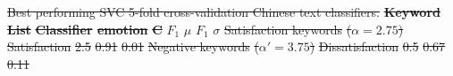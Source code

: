 \documentclass[smallextended,natbib]{svjour3}       %
\providecommand{\DIFdel}[1]{{\protect\color{red}\sout{#1}}}                      %
\providecommand{\DIFdelFL}[1]{\DIFdel{#1}} %
\begin{document}
{%
\DIFdelFL{Best performing SVC 5-fold cross-validation Chinese text classifiers.}}
\textbf{\DIFdelFL{Keyword List}} %
\textbf{%
\DIFdelFL{Classifier }%
\DIFdelFL{emotion}%
} %
\textbf{\DIFdelFL{C}} %
\DIFdelFL{\(F_1\) }%
\DIFdelFL{\(\mu\)}%
\DIFdelFL{\(F_1\) }%
\DIFdelFL{\(\sigma\)}%
\DIFdelFL{Satisfaction keywords }%
\DIFdelFL{(\(\alpha=2.75\))}%
\DIFdelFL{Satisfaction }%
\DIFdelFL{2.5 }%
\DIFdelFL{0.91 }%
\DIFdelFL{0.01 }%
\DIFdelFL{Negative keywords }%
\DIFdelFL{(\(\alpha'=3.75\))}%
\DIFdelFL{Dissatisfaction }%
\DIFdelFL{0.5 }%
\DIFdelFL{0.67 }%
\DIFdelFL{0.11 }%
\end{document}
